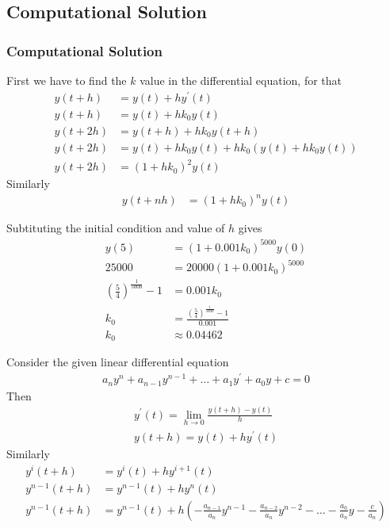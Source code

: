 \documentclass{beamer}
\providecommand{\brak}[1]{\ensuremath{\left(#1\right)}}
\theoremstyle{remark}
\numberwithin{equation}{section}
\begin{document}
\subsection{Computational Solution}
\begin{frame}
\frametitle{Computational Solution}
First we have to find the $k$ value in the differential equation, for that
\begin{align}
	y\brak{t+h} &= y\brak{t} + hy^\prime\brak{t}\\
	y\brak{t+h} &= y\brak{t} + hk_{0}y\brak{t}\\
	y\brak{t+2h} &= y\brak{t+h} + hk_{0}y\brak{t+h}\\
	y\brak{t+2h} &= y\brak{t} + hk_{0}y\brak{t} + hk_{0}\brak{y\brak{t} + hk_{0}y\brak{t}}\\
	y\brak{t+2h} &= \brak{1+hk_{0}}^2y\brak{t}
\end{align}
Similarly
\begin{align}
	y\brak{t+nh} &= \brak{1+hk_{0}}^ny\brak{t}
\end{align}
\end{frame}
\begin{frame}
Subtituting the initial condition and value of $h$ gives
\begin{align}
	y\brak{5} &= \brak{1+0.001k_{0}}^{5000}y\brak{0}\\
	25000 &= 20000\brak{1+0.001k_{0}}^{5000}\\
	\brak{\frac{5}{4}}^{\frac{1}{5000}} - 1 &= 0.001k_{0}\\
	k_{0} &= \frac{\brak{\frac{5}{4}}^{\frac{1}{5000}} - 1}{0.001}\\
	k_{0} &\approx 0.04462
\end{align}
\end{frame}
\begin{frame}
Consider the given linear differential equation
\begin{align}
	a_{n}y^n + a_{n-1}y^{n-1} + \dots + a_{1}y^\prime + a_{0}y + c = 0
\end{align}
Then
\begin{align}
	y^{\prime}\brak{t} = \lim_{h\to 0}\frac{y\brak{t+h} - y\brak{t}}{h}\\
	y\brak{t+h} = y\brak{t} + hy^{\prime}\brak{t}
\end{align}
Similarly
\begin{align}
	y^{i}\brak{t+h} &= y^{i}\brak{t} + hy^{i+1}\brak{t}\\
	y^{n-1}\brak{t+h} &= y^{n-1}\brak{t} + hy^{n}\brak{t}\\
	y^{n-1}\brak{t+h} &= y^{n-1}\brak{t} + h\brak{-\frac{a_{n-1}}{a_n}y^{n-1}-\frac{a_{n-2}}{a_n}y^{n-2} - \dots -\frac{a_{0}}{a_n}y - \frac{c}{a_n}}
\end{align}
\end{frame}
\end{document}
